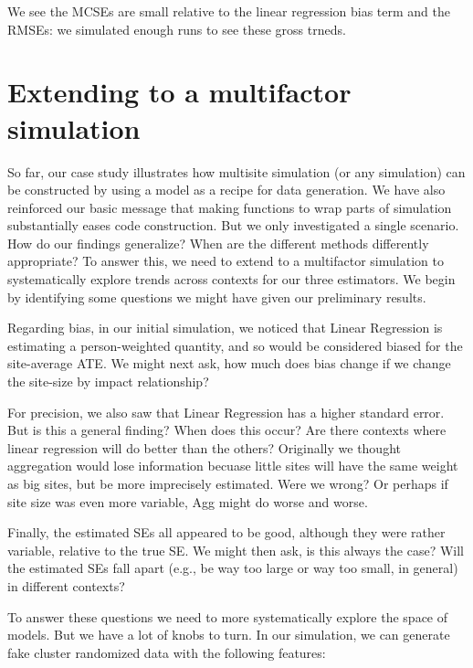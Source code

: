 \documentclass[
]{book}
\begin{document}
We see the MCSEs are small relative to the linear regression bias term and the RMSEs: we simulated enough runs to see these gross trneds.

\hypertarget{extending-to-a-multifactor-simulation}{%
\section{Extending to a multifactor simulation}\label{extending-to-a-multifactor-simulation}}

So far, our case study illustrates how multisite simulation (or any simulation) can be constructed by using a model as a recipe for data generation.
We have also reinforced our basic message that making functions to wrap parts of simulation substantially eases code construction.
But we only investigated a single scenario.
How do our findings generalize? When are the different methods differently appropriate?
To answer this, we need to extend to a multifactor simulation to systematically explore trends across contexts for our three estimators.
We begin by identifying some questions we might have given our preliminary results.

Regarding bias, in our initial simulation, we noticed that Linear Regression is estimating a person-weighted quantity, and so would be considered biased for the site-average ATE.
We might next ask, how much does bias change if we change the site-size by impact relationship?

For precision, we also saw that Linear Regression has a higher standard error.
But is this a general finding? When does this occur?
Are there contexts where linear regression will do better than the others?
Originally we thought aggregation would lose information becuase little sites will have the same weight as big sites, but be more imprecisely estimated.
Were we wrong? Or perhaps if site size was even more variable, Agg might do worse and worse.

Finally, the estimated SEs all appeared to be good, although they were rather variable, relative to the true SE.
We might then ask, is this always the case? Will the estimated SEs fall apart (e.g., be way too large or way too small, in general) in different contexts?

To answer these questions we need to more systematically explore the space of models. But we have a lot of knobs to turn.
In our simulation, we can generate fake cluster randomized data with the following features:
\end{document}
